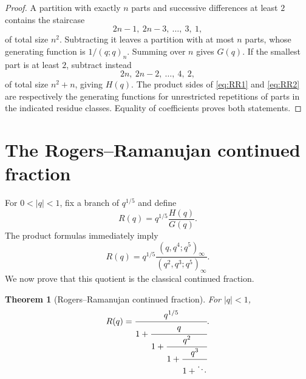 \documentclass[11pt]{article}
\theoremstyle{blueplain}
\newtheorem{theorem}{Theorem}[section]
\theoremstyle{bluedef}
\begin{document}
\begin{proof}
A partition with exactly $n$ parts and successive differences at least $2$ contains the staircase
\[
2n-1,\ 2n-3,\ \ldots,\ 3,\ 1,
\]
of total size $n^2$.  Subtracting it leaves a partition with at most $n$ parts, whose generating function is $1/(q;q)_n$.  Summing over $n$ gives $G(q)$.  If the smallest part is at least $2$, subtract instead
\[
2n,\ 2n-2,\ \ldots,\ 4,\ 2,
\]
of total size $n^2+n$, giving $H(q)$.  The product sides of \eqref{eq:RR1} and \eqref{eq:RR2} are respectively the generating functions for unrestricted repetitions of parts in the indicated residue classes.  Equality of coefficients proves both statements.
\end{proof}

\section{The Rogers--Ramanujan continued fraction}

For $0<|q|<1$, fix a branch of $q^{1/5}$ and define
\begin{equation}\label{eq:R-def}
R(q)=q^{1/5}\frac{H(q)}{G(q)}.
\end{equation}
The product formulas immediately imply
\begin{equation}\label{eq:R-product}
R(q)=q^{1/5}\frac{(q,q^4;q^5)_\infty}{(q^2,q^3;q^5)_\infty}.
\end{equation}
We now prove that this quotient is the classical continued fraction.

\begin{theorem}[Rogers--Ramanujan continued fraction]\label{thm:RRCF}
For $|q|<1$,
\begin{equation}\label{eq:RRCF}
R(q)=\cfrac{q^{1/5}}{
1+\cfrac{q}{
1+\cfrac{q^2}{
1+\cfrac{q^3}{1+\ddots}}}}.
\end{equation}
\end{theorem}
\end{document}
